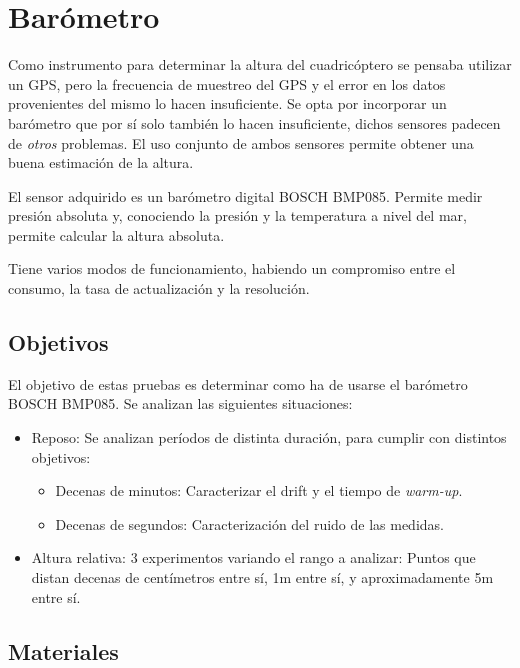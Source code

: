 \documentclass[main]{subfiles}
\begin{document}
\chapter{Bar\'ometro}
\label{chap:barometro}

Como instrumento para determinar la altura del cuadric\'optero se pensaba utilizar un GPS, pero la frecuencia de muestreo del GPS y el error en los datos provenientes del mismo lo hacen insuficiente. Se opta por incorporar un bar\'ometro que por sí solo también lo hacen insuficiente, dichos sensores padecen de \textit{otros} problemas. El uso conjunto de ambos sensores permite obtener una buena estimaci\'on de la altura.

El sensor adquirido es un bar\'ometro digital BOSCH BMP085. Permite medir presi\'on absoluta y, conociendo la presi\'on y la temperatura a nivel del mar, permite calcular la altura absoluta.

Tiene varios modos de funcionamiento, habiendo un compromiso entre el consumo, la tasa de actualizaci\'on y la resoluci\'on.

\section{Objetivos}

El objetivo de estas pruebas es determinar como ha de usarse el bar\'ometro BOSCH BMP085. Se analizan las siguientes situaciones:

\begin{itemize}
\item Reposo: Se analizan per\'iodos de distinta duraci\'on, para cumplir con distintos objetivos:
  \begin{itemize}
  \item Decenas de minutos: Caracterizar el drift y el tiempo de \textit{warm-up}.
  \item Decenas de segundos: Caracterizaci\'on del ruido de las medidas.
  \end{itemize}
\item Altura relativa: 3 experimentos variando el rango a analizar: Puntos que distan decenas de cent\'imetros entre s\'i, 1m entre s\'i, y aproximadamente 5m entre s\'i.
\end{itemize}

\newpage
\section{Materiales}
\label{sec:materiales}
\end{document}
